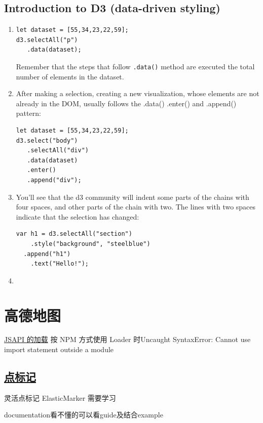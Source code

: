 \documentclass[a4paper, 12pt]{article}
\begin{document}
\subsection{Introduction to D3 (data-driven styling)}
\begin{enumerate}
\item 
\begin{verbatim}
let dataset = [55,34,23,22,59];
d3.selectAll("p")
   .data(dataset);
\end{verbatim}
Remember that the steps that follow \verb|.data()| method are executed the total number of elements in the dataset.

\item 
After making a selection, creating a new visualization, whose elements are not already in the DOM, usually follows the .data() .enter() and .append() pattern:
\begin{verbatim}
let dataset = [55,34,23,22,59];
d3.select("body")
   .selectAll("div")
   .data(dataset)
   .enter()
   .append("div");
\end{verbatim}

\item You'll see that the d3 community will indent some parts of the chains with four spaces, and other parts of the chain with two. The lines with two spaces indicate that the selection has changed:
\begin{verbatim}
var h1 = d3.selectAll("section")
    .style("background", "steelblue")
  .append("h1")
    .text("Hello!");
\end{verbatim}

\item 

\end{enumerate}


\section{高德地图}
\href{https://lbs.amap.com/api/jsapi-v2/guide/abc/load}{JSAPI 的加载} 按 NPM 方式使用 Loader 时{\color{red}Uncaught SyntaxError: Cannot use import statement outside a module}

\subsection{\href{https://lbs.amap.com/api/jsapi-v2/guide/overlays/marker}{点标记}}
灵活点标记 ElasticMarker 需要学习

documentation看不懂的可以看guide及结合example
\end{document}
